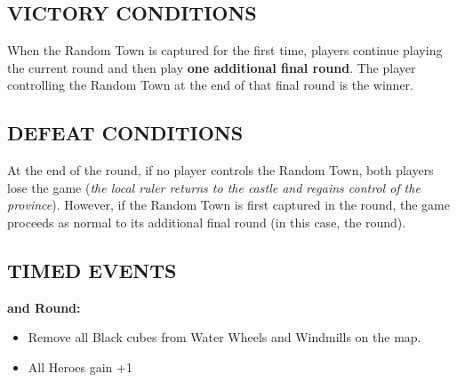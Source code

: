 \begin{multicols*}{2}
\subsection*{\MakeUppercase{Victory Conditions}}
When the Random Town is captured for the first time, players continue playing the current round and then play \textbf{one additional final round}.
The player controlling the Random Town at the end of that final round is the winner.

\subsection*{\MakeUppercase{Defeat Conditions}}
At the end of the  round, if no player controls the Random Town, both players lose the game (\textit{the local ruler returns to the castle and regains control of the province}).
However, if the Random Town is first captured in the  round, the game proceeds as normal to its additional final round (in this case, the  round).

\subsection*{\MakeUppercase{Timed Events}}

  \textbf{ and  Round:}
\begin{itemize}
  \item Remove all Black cubes from Water Wheels and Windmills on the map.
  \item All Heroes gain +1 
\end{itemize}

\end{multicols*}

